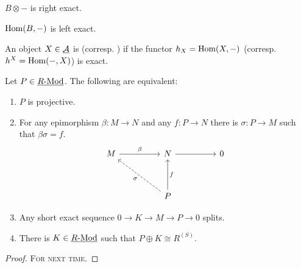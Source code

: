 \begin{examples*}
	\item \( B \otimes - \) is right exact.
	\item \( \operatorname{Hom}(B, -) \) is left exact.
\end{examples*}

\begin{definition*}
	An object \( X \in \underline{\mathcal A} \) is  (corresp. ) if the functor \( h_X = \operatorname{Hom}(X, -) \) (corresp. \( h^X = \operatorname{Hom}(-, X) \)) is exact.
\end{definition*}

\newpage

\begin{theorem*}
	Let \( P \in \underline{R\text{-}\mathrm{Mod}} \). The following are equivalent:
	\begin{enumerate}
		\item \( P \) is projective.
		\item For any epimorphism \( \beta: M \to N \) and any \( f: P \to N \) there is \( \sigma: P \to M \) such that \( \beta \sigma = f \).
			\[
				\begin{tikzcd}
					M && N && 0 \\
					\\
					&& P
					\arrow["\beta", from=1-1, to=1-3]
					\arrow[from=1-3, to=1-5]
					\arrow["\sigma", dashed, from=3-3, to=1-1]
					\arrow["f"', from=3-3, to=1-3]
				\end{tikzcd}
			\]
		\item Any short exact sequence \( 0 \to K \to M \to P \to 0 \) splits.
		\item There is \( K \in \underline{R\text{-}\mathrm{Mod}} \) such that \( P \oplus K \cong R^{(S)} \).
	\end{enumerate}
\end{theorem*}
\begin{proof}
	\textsc{For next time}.
\end{proof}